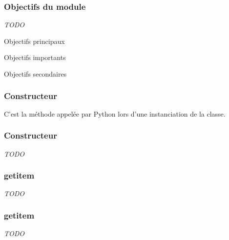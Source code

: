 \documentclass{beamer}
\begin{document}
\begin{frame}
\frametitle{Objectifs du module}
\begin{center}
    \emph{TODO}
\begin{block}{Objectifs principaux}
\end{block}
\pause
\begin{minipage}{0.45\textwidth} \begin{center}
    \begin{block}{Objectifs importants}
    \end{block}
\end{center} \end{minipage}
\hspace{2ex} \pause
\begin{minipage}{0.45\textwidth} \begin{center}
    \begin{block}{Objectifs secondaires}
    \end{block}
\end{center} \end{minipage}
\end{center}
\end{frame}


\begin{frame}
\frametitle{Constructeur}
\begin{center}
C'est la méthode appelée par Python lors d'une instanciation de la classe.
\end{center}
\end{frame}


\begin{frame}
\frametitle{Constructeur}
\begin{center}
\emph{TODO}
\end{center}
\end{frame}


\begin{frame}
\frametitle{getitem}
\begin{center}
\emph{TODO}
\end{center}
\end{frame}


\begin{frame}
\frametitle{getitem}
\begin{center}
\emph{TODO}
\end{center}
\end{frame}
\end{document}
